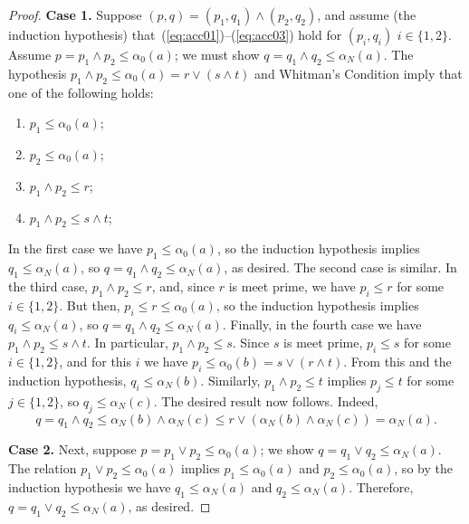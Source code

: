 \begin{proof}
    \medskip
    \noindent \textbf{Case 1.}
    Suppose $(p,q) = (p_1, q_1) \wedge (p_2, q_2)$, and assume (the induction hypothesis) 
    that~(\ref{eq:acc01})--(\ref{eq:acc03}) hold for
    $(p_i,q_i)$ $i\in \{1,2\}$.
    Assume $p = p_1\wedge p_2 \leq \alpha_0(a)$; we must show 
    $q=q_1\wedge q_2 \leq \alpha_N(a)$.
    The hypothesis $p_1\wedge p_2 \leq \alpha_0(a) = r\vee (s \wedge t)$ and
    Whitman's Condition imply that one of the following holds:
    \begin{enumerate}
      \item   $p_1\leq \alpha_0(a)$;  
      \item   $p_2\leq \alpha_0(a)$;  
      \item   $p_1\wedge p_2\leq r$;  
      \item   $p_1\wedge p_2 \leq s \wedge t$;  
    \end{enumerate}
    In the first case we have $p_1\leq \alpha_0(a)$, so
    the induction hypothesis implies $q_1\leq \alpha_N(a)$, so 
    $q = q_1\wedge q_2\leq \alpha_N(a)$, as desired.  
    The second case is similar.
    In the third case, $p_1 \wedge p_2 \leq r$, and, since $r$ is meet prime, we have
    $p_i\leq r$ for some $i\in \{1,2\}$.  
    But then, $p_i \leq r \leq \alpha_0(a)$, so 
    the induction hypothesis implies $q_i \leq \alpha_N(a)$, so 
    $q = q_1\wedge q_2\leq \alpha_N(a)$.
    Finally, in the fourth case we have $p_1\wedge p_2 \leq s \wedge t$. 
    In particular, $p_1\wedge p_2 \leq s$. Since $s$ is meet prime,
    $p_i\leq s$ for some $i\in \{1,2\}$,  
    and for this $i$ we have $p_i \leq \alpha_0(b) = s\vee (r\wedge t)$.
    From this and the induction hypothesis, $q_i \leq \alpha_N(b)$.
    Similarly, $p_1\wedge p_2 \leq t$ implies 
    $p_j\leq t$ for some $j\in \{1,2\}$, so $q_j \leq \alpha_N(c)$.
    The desired result now follows. Indeed,
    \[
    q = q_1\wedge q_2 \leq \alpha_N(b) \wedge \alpha_N(c) 
    \leq r \vee (\alpha_N(b)\wedge \alpha_N(c)) = \alpha_N(a).
    \] 
  
    \medskip
    \noindent \textbf{Case 2.}
    Next, suppose $p = p_1\vee p_2 \leq \alpha_0(a)$; we show 
    $q = q_1 \vee q_2 \leq \alpha_N(a)$. 
    The relation $p_1\vee p_2 \leq \alpha_0(a)$ implies 
    $p_1\leq \alpha_0(a)$ and $p_2\leq \alpha_0(a)$, 
    so by the induction hypothesis we have 
    $q_1\leq \alpha_N(a)$ and $q_2\leq \alpha_N(a)$.  
    Therefore, $q = q_1 \vee q_2 \leq \alpha_N(a)$, as desired.


\end{proof}
